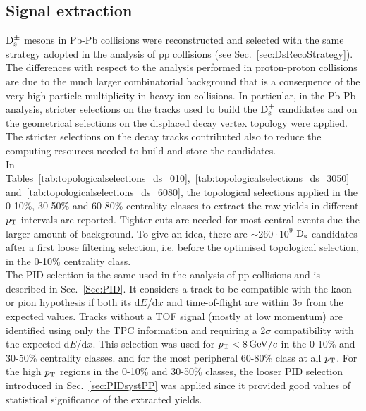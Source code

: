 \subsection{Signal extraction}
\label{sec:SelectionPbPb}
${\rm D_s^{\pm}}$ mesons in Pb-Pb collisions were reconstructed 
and selected with the same strategy adopted in the analysis of pp 
collisions (see Sec.~\ref{sec:DsRecoStrategy}). The differences with respect to
the analysis performed in proton-proton collisions are due to the much larger
combinatorial background that is a consequence of the very 
high particle multiplicity in heavy-ion collisions. In particular, 
in the Pb-Pb analysis, stricter selections on the tracks 
used to build the ${\rm D_s^{\pm}}$ candidates and on the geometrical selections
on the displaced decay vertex topology were applied. 
The stricter selections on the decay tracks contributed also to reduce the computing resources 
needed to build and store the candidates. \\



In Tables~\ref{tab:topologicalselections_ds_010},~\ref{tab:topologicalselections_ds_3050} 
and~\ref{tab:topologicalselections_ds_6080}, the topological selections applied 
in the 0-10$\%$, 30-50\% and 60-80$\%$ centrality classes
to extract the raw yields in different $p_{\rm T}$ intervals are reported. Tighter cuts 
are needed for most central events due the larger amount of background. To give an idea, there are $\sim260 \cdot 10^9$
${\rm D_s}$ candidates after a first loose filtering selection, i.e. before the optimised topological selection, in the 0-10\% centrality class.\\



The PID selection is the same used in the analysis of pp collisions and 
is described in Sec.~\ref{Sec:PID}. It considers a track to be 
compatible with the kaon or pion hypothesis 
if both its d$E$/d$x$ and time-of-flight are within 3$\sigma$ from the expected values. 
Tracks without a TOF signal (mostly at low momentum) are 
identified using only the TPC information and requiring a 2$\sigma$ 
compatibility with the expected d$E$/d$x$. This selection was used 
for $p_{\rm T} < 8 \, \mathrm{GeV}/c$ in the 0-10\% and 30-50\% centrality classes. 
and for the most peripheral 60-80\% class at all $p_{\rm T}$. For the high $p_{\rm T}$ regions
in the 0-10\% and 30-50\% classes, the looser PID selection introduced in Sec.~\ref{sec:PIDsystPP}
was applied since it provided good values of statistical significance of the extracted yields.


